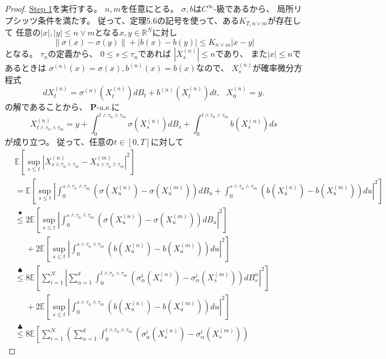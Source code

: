 \documentclass[uplatex]{jsarticle}
\theoremstyle{definition}
\def\R{\mathbb{R}}
\def\P{\mathbf{P}}
\def\E{\mathbb{E}}
\begin{document}
\begin{proof}
  \underline{Step 1}を実行する。
  \(n,m\)を任意にとる。
  \(\sigma,b\)は\(C^\infty\)-級であるから、
  局所リプシッツ条件を満たす。
  従って、定理5.6の記号を使って、ある\(K_{T,n\vee m}\)が存在して
  任意の\(|x|,|y| \leq n\vee m\)となる\(x,y\in \R^N\)に対し
  \[
  \| \sigma(x) - \sigma(y) \| + |b(x) - b(y)|
  \leq K_{n\vee m}|x-y|
  \]
  となる。
  \(\tau_n\)の定義から、
  \(0 \leq s \leq \tau_n\)であれば
  \(|X_s^{(n)}| \leq n\)であり、
  また\(|x| \leq n\)であるときは
  \(\sigma^{(n)}(x) = \sigma(x), b^{(n)}(x) = b(x)\)なので、
  \(X_s^{(n)}\)が確率微分方程式
  \[
  dX_t^{(n)} = \sigma^{(n)}(X_t^{(n)}) dB_t + b^{(n)}(X_t^{(n)})dt,
  \ \ \ X_0^{(n)}=y.
  \]
  の解であることから、
  \(\P\)-a.s.に
  \[
  X_{t\wedge \tau_n \wedge \tau_m}^{(n)}
  = y + \int_0^{t\wedge \tau_n \wedge \tau_m}\sigma(X_s^{(n)}) dB_s
  + \int_0^{t\wedge \tau_n \wedge \tau_m} b(X_s^{(n)})ds
  \]
  が成り立つ。
  従って、任意の\(t\in [0,T]\)に対して
  \begin{align*}
    &\E \left[ \sup_{s \leq t} \left|
    X_{s\wedge \tau_n \wedge \tau_m}^{(n)}
    - X_{s\wedge \tau_n \wedge \tau_m}^{(m)}\right|^2\right] \\
    &= \E \left[ \sup_{s \leq t} \left|
    \int_0^{s\wedge \tau_n \wedge \tau_m}
    \left( \sigma(X_u^{(n)}) - \sigma(X_u^{(m)}) \right) dB_u
    + \int_0^{s\wedge \tau_n \wedge \tau_m}
    \left( b(X_u^{(n)}) - b(X_u^{(m)})\right) du
    \right|^2 \right] \\
    &\overset{\bigstar}{\leq}
    2 \E \left[ \sup_{s \leq t} \left|
    \int_0^{s\wedge \tau_n \wedge \tau_m}
    \left( \sigma(X_u^{(n)}) - \sigma(X_u^{(m)}) \right) dB_u
    \right|^2 \right] \\
    &\ \ \ \ \ \
    + 2\E \left[ \sup_{s \leq t} \left|
    \int_0^{s\wedge \tau_n \wedge \tau_m}
    \left( b(X_u^{(n)}) - b(X_u^{(m)})\right) du
    \right|^2 \right] \\
    &\overset{\spadesuit}{\leq}
    8 \E \left[ \sum_{i=1}^N \left| \sum_{\alpha=1}^d
    \int_0^{t\wedge \tau_n \wedge \tau_m}
    \left( \sigma_\alpha^i(X_s^{(n)}) - \sigma_\alpha^i(X_s^{(m)}) \right)
    dB_s^\alpha \right|^2 \right] \\
    &\ \ \ \ \ \
    + 2\E \left[ \sup_{s \leq t} \left|
    \int_0^{s\wedge \tau_n \wedge \tau_m}
    \left( b(X_u^{(n)}) - b(X_u^{(m)})\right) du
    \right|^2 \right] \\
    &\overset{\clubsuit}{\leq}
    8 \E \left[ \sum_{i=1}^N \left(\sum_{\alpha=1}^d
    \int_0^{t\wedge \tau_n \wedge \tau_m}
    \left( \sigma_\alpha^i(X_s^{(n)}) - \sigma_\alpha^i(X_s^{(m)}) \right)

\end{align*}
\end{proof}
\end{document}
